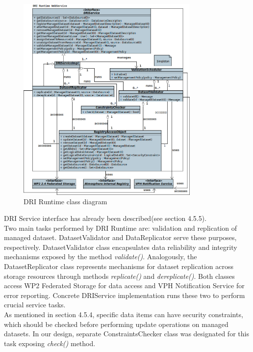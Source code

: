 \documentclass[a4paper,12pt,titlepage]{article}
\begin{document}
\begin{figure}[h!]
	\centering
	\includegraphics[width=0.8\textwidth]{img/dri-service.png}
	\caption{DRI Runtime class diagram}
	\label{fig:dri-service}
\end{figure}

\noindent
DRI Service interface has already been described(see section 4.5.5).\\

\noindent
Two main tasks performed by DRI Runtime are: validation and replication of managed dataset. DatasetValidator and DataReplicator serve these purposes, respectively. DatasetValidator class encapsulates data reliability and integrity mechanisms exposed by the method \textit{validate()}. Analogously, the DatasetReplicator class represents mechanisms for dataset replication across storage resources through methods \textit{replicate()} and \textit{dereplicate()}. Both classes access WP2 Federated Storage for data access and VPH Notification Service for error reporting. Concrete DRIService implementation runs these two to perform crucial service tasks. \\

\noindent
As mentioned in section 4.5.4, specific data items can have security constraints, which should be checked before performing update operations on managed datasets. In our design, separate ConstraintsChecker class was designated for this task exposing \textit{check()} method.\\
\end{document}
